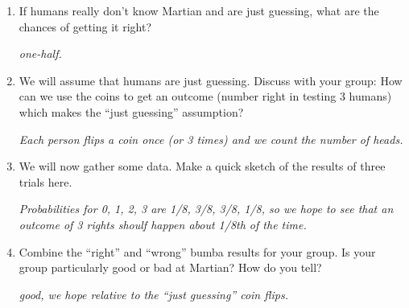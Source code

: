 \begin{enumerate}
\item  If humans really don't know Martian and are just guessing, what
  are the chances of getting it right? 
\begin{students}
  \vspace{2cm}
\end{students}    
\begin{key}
   {\it one-half.}
\end{key}
 
  \item  We will assume that humans are just guessing. Discuss with
    your group: How can we use the coins to get an outcome (number
    right in testing 3 humans) which makes the ``just guessing'' assumption? 
\begin{students}
  \vspace{1.5cm}
\end{students}    
\begin{key}
   {\it Each person flips a coin once (or 3 times) and we count the
     number of heads.}
\end{key}
 
\item We will now gather some data.  Make a quick sketch of the
  results of three trials here.
\begin{students}
  \vspace{2cm}
\end{students}    
\begin{key}
   {\it Probabilities for 0, 1, 2, 3 are 1/8, 3/8, 3/8, 1/8, so we
     hope to see that an outcome of 3 rights shoulf happen about 1/8th
   of the time.}
\end{key}

\item Combine the ``right'' and ``wrong'' bumba results for your
    group.  Is your group particularly good or bad at Martian? How do
    you tell?
\begin{students}
  \vspace{1cm}
\end{students}    
\begin{key}
   {\it good, we hope relative to the ``just guessing'' coin flips.}
\end{key}



\end{enumerate}
